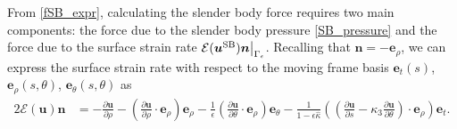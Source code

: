 \documentclass[11pt]{article}
\numberwithin{equation}{section}
\newcommand{\E}{\mathcal{E}}
\newcommand{\bu}{\bm{u}}
\newcommand{\be}{\bm{e}}
\newcommand{\p}{\partial}
\newcommand{\SB}{{\rm SB}}
\newcommand{\wh}[1]{\widehat{#1}}
\theoremstyle{definition}
\begin{document}
From \eqref{fSB_expr}, calculating the slender body force requires two main components: the force due to the slender body pressure \eqref{SB_pressure} and the force due to the surface strain rate $\E(\bu^{\SB})\bm{n}\big|_{\Gamma_\epsilon}$. Recalling that ${\bm n}=-\be_\rho$, we can express the surface strain rate with respect to the moving frame basis $\be_t(s)$, $\be_\rho(s,\theta)$, $\be_\theta(s,\theta)$ as
\begin{equation}\label{SB_strain}
\begin{aligned}
2\E(\bu){\bm n} &= -\frac{\p\bu}{\p\rho} -\left(\frac{\p \bu}{\p \rho}\cdot\be_{\rho}\right)\be_{\rho} - \frac{1}{\epsilon}\left(\frac{\p \bu}{\p \theta}\cdot\be_{\rho} \right)\be_{\theta}- \frac{1}{1-\epsilon\wh\kappa}\left(\left(\frac{\p \bu}{\p s}-\kappa_3\frac{\p \bu}{\p\theta}\right)\cdot \be_{\rho}\right) \be_{t}.
\end{aligned}
\end{equation}
\end{document}
